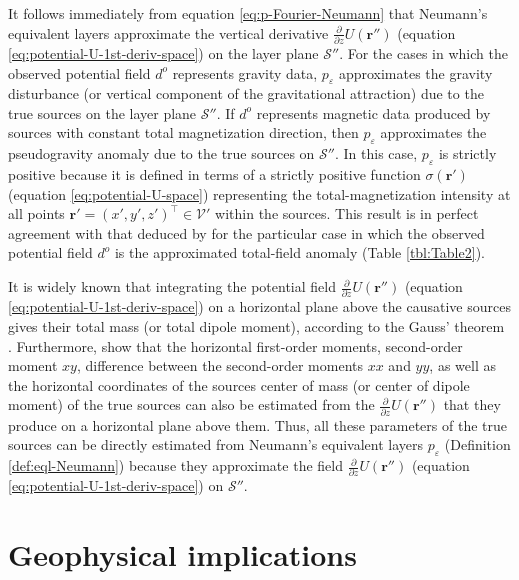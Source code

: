 \documentclass[manuscript,noblind]{geophysics}
\begin{document}
	It follows immediately from equation \ref{eq:p-Fourier-Neumann} that Neumann's equivalent layers approximate 
	the vertical derivative $\tfrac{\partial}{\partial z} U(\mathbf{r}'')$ (equation \ref{eq:potential-U-1st-deriv-space}) 
	on the layer plane $\mathcal{S}''$.
	For the cases in which the observed potential field $d^{o}$ represents gravity data, 
	$p_{\varepsilon}$ approximates the gravity disturbance (or vertical component of the gravitational
	attraction) due to the true sources on the layer plane $\mathcal{S}''$.
	If $d^{o}$ represents magnetic data produced by sources with constant total magnetization direction, 
	then $p_{\varepsilon}$ approximates the pseudogravity 
	anomaly \citep[][ p. 345]{blakely1996} due to the true sources on $\mathcal{S}''$.
	In this case, $p_{\varepsilon}$ is strictly positive because it is defined in terms of a strictly positive 
	function $\sigma(\mathbf{r}')$ (equation \ref{eq:potential-U-space}) representing the 
	total-magnetization intensity at all points $\mathbf{r}' = (x', y', z')^{\top} \in \mathcal{V}'$ 
	within the sources.
	This result is in perfect agreement with that deduced by \citet{reis_etal2020} for
	the particular case in which the observed potential field $d^{o}$ is
	the approximated total-field anomaly (Table \ref{tbl:Table2}).
	
	It is widely known that integrating the potential field $\tfrac{\partial}{\partial z} U(\mathbf{r}'')$ 
	(equation \ref{eq:potential-U-1st-deriv-space}) on a horizontal plane above the causative sources
	gives their total mass (or total dipole moment), according to the
	Gauss' theorem \citep[e.g.,][]{hammer1945, lafehr1965, bhattacharyya1967}. 
	Furthermore, \citet{medeiros-silva1995a} show that the horizontal first-order moments, second-order moment $xy$, 
	difference between the second-order moments $xx$ and $yy$, as well as the horizontal coordinates of the sources center of mass
	(or center of dipole moment) of the true sources can also be estimated from the $\tfrac{\partial}{\partial z} U(\mathbf{r}'')$
	that they produce on a horizontal plane above them.
	Thus, all these parameters of the true sources can be directly estimated from 
	Neumann's equivalent layers $p_{\varepsilon}$ (Definition \ref{def:eql-Neumann}) because
	they approximate the field $\tfrac{\partial}{\partial z} U(\mathbf{r}'')$ (equation \ref{eq:potential-U-1st-deriv-space}) 
	on $\mathcal{S}''$.
	
	\section{Geophysical implications}
	
\end{document}
